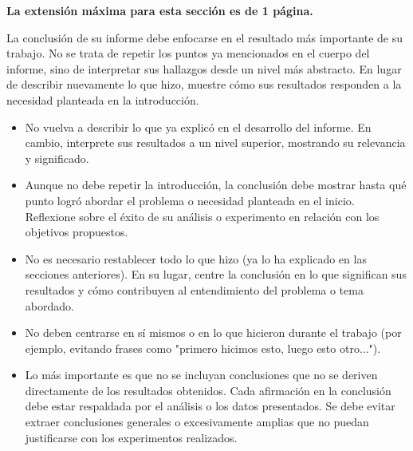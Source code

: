 \begin{mdframed}
    \textbf{La extensión máxima para esta sección es de 1 página.}
\end{mdframed}

La conclusión de su informe debe enfocarse en el resultado más importante de su trabajo. No se trata de repetir los puntos ya mencionados en el cuerpo del informe, sino de interpretar sus hallazgos desde un nivel más abstracto. En lugar de describir nuevamente lo que hizo, muestre cómo sus resultados responden a la necesidad planteada en la introducción.

\begin{itemize}
    \item  No vuelva a describir lo que ya explicó en el desarrollo del informe. En cambio, interprete sus resultados a un nivel superior, mostrando su relevancia y significado.
    \item Aunque no debe repetir la introducción, la conclusión debe mostrar hasta qué punto logró abordar el problema o necesidad planteada en el inicio. Reflexione sobre el éxito de su análisis o experimento en relación con los objetivos propuestos.
    \item No es necesario restablecer todo lo que hizo (ya lo ha explicado en las secciones anteriores). En su lugar, centre la conclusión en lo que significan sus resultados y cómo contribuyen al entendimiento del problema o tema abordado.
    \item No deben centrarse en sí mismos o en lo que hicieron durante el trabajo (por ejemplo, evitando frases como "primero hicimos esto, luego esto otro...").
    \item Lo más importante es que no se incluyan conclusiones que no se deriven directamente de los resultados obtenidos. Cada afirmación en la conclusión debe estar respaldada por el análisis o los datos presentados. Se debe evitar extraer conclusiones generales o excesivamente amplias que no puedan justificarse con los experimentos realizados.
\end{itemize}
